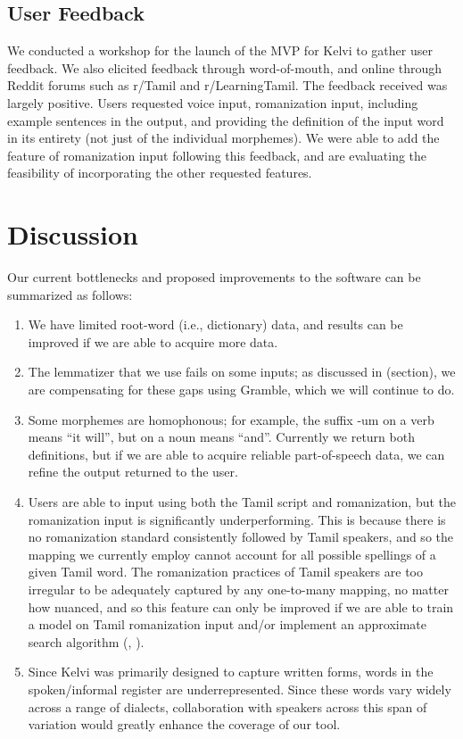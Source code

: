 \documentclass[11pt]{article}
\begin{document}
\subsection{User Feedback}
We conducted a workshop for the launch of the MVP for Kelvi to 
gather user feedback. We also elicited feedback through word-of-mouth, 
and online through Reddit forums such as r/Tamil and r/LearningTamil. 
The feedback received was largely positive. Users requested voice input, 
romanization input, including example sentences in the output, and 
providing the definition of the input word in its entirety 
(not just of the individual morphemes). We were able to add the 
feature of romanization input following this feedback, and are 
evaluating the feasibility of incorporating the other requested features.

\section{Discussion}
Our current bottlenecks and proposed improvements to the software can be summarized as follows:
\begin{enumerate}
  \item We have limited root-word (i.e., dictionary) data, and results can be improved if we are able to acquire more data. 
  \item The lemmatizer that we use fails on some inputs; as discussed in (section), we are compensating for these gaps using Gramble, which we will continue to do. 
  \item Some morphemes are homophonous; for example, the suffix -um on a verb means “it will”, but on a noun means “and”. Currently we return both definitions, but if we are able to acquire reliable part-of-speech data, we can refine the output returned to the user. 
  \item Users are able to input using both the Tamil script and romanization, but the romanization input is significantly underperforming. This is because there is no romanization standard consistently followed by Tamil speakers, and so the mapping we currently employ cannot account for all possible spellings of a given Tamil word. The romanization practices of Tamil speakers are too irregular to be adequately captured by any one-to-many mapping, no matter how nuanced, and so this feature can only be improved if we are able to train a model on Tamil romanization input and/or implement an approximate search algorithm (\citealp{pine_zero-shot_2025}, \citealp{littell_waldayu_2017}).
  \item Since Kelvi was primarily designed to capture written forms, words in the spoken/informal register are underrepresented. Since these words vary widely across a range of dialects, collaboration with speakers across this span of variation would greatly enhance the coverage of our tool.
\end{enumerate}
\end{document}
